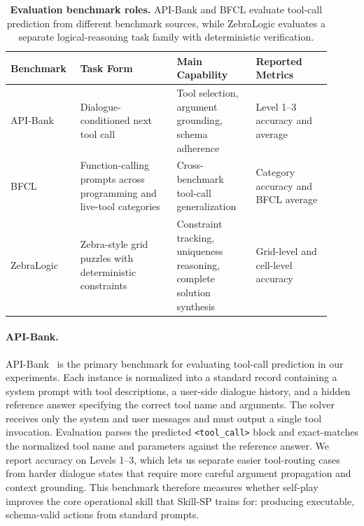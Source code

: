 \begin{table}[htbp]
    \centering
    \small
    \begin{tabular}{>{\raggedright\arraybackslash}p{0.18\linewidth} >{\raggedright\arraybackslash}p{0.28\linewidth} >{\raggedright\arraybackslash}p{0.23\linewidth} >{\raggedright\arraybackslash}p{0.22\linewidth}}
        \toprule
        \textbf{Benchmark} & \textbf{Task Form} & \textbf{Main Capability} & \textbf{Reported Metrics} \\
        \midrule
        API-Bank \newline \citep{li2023api} & Dialogue-conditioned next tool call & Tool selection, argument grounding, schema adherence & Level 1--3 accuracy and average \\
        \addlinespace
        BFCL \newline \citep{patil2025berkeley} & Function-calling prompts across programming and live-tool categories & Cross-benchmark tool-call generalization & Category accuracy and BFCL average \\
        \addlinespace
        ZebraLogic \newline \citep{lin2025zebralogic} & Zebra-style grid puzzles with deterministic constraints & Constraint tracking, uniqueness reasoning, complete solution synthesis & Grid-level and cell-level accuracy \\
        \bottomrule
    \end{tabular}
    \caption{\textbf{Evaluation benchmark roles.} API-Bank and BFCL evaluate tool-call prediction from different benchmark sources, while ZebraLogic evaluates a separate logical-reasoning task family with deterministic verification.}
    \label{tab:benchmark_analysis}
\end{table}

\paragraph{API-Bank.}
API-Bank~\citep{li2023api} is the primary benchmark for evaluating tool-call prediction in our experiments.
Each instance is normalized into a standard record containing a system prompt with tool descriptions, a user-side dialogue history, and a hidden reference answer specifying the correct tool name and arguments.
The solver receives only the system and user messages and must output a single tool invocation.
Evaluation parses the predicted \texttt{<tool\_call>} block and exact-matches the normalized tool name and parameters against the reference answer.
We report accuracy on Levels 1--3, which lets us separate easier tool-routing cases from harder dialogue states that require more careful argument propagation and context grounding.
This benchmark therefore measures whether self-play improves the core operational skill that Skill-SP trains for: producing executable, schema-valid actions from standard prompts.

